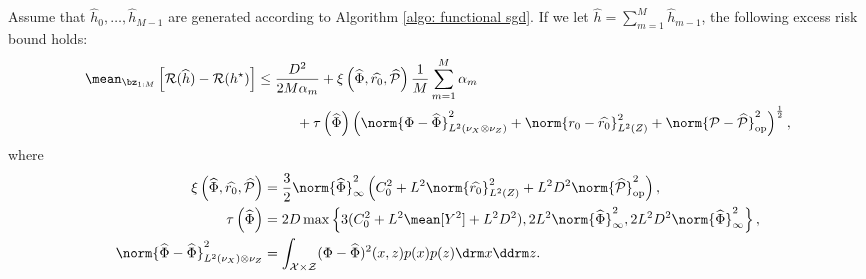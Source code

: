 \begin{theorem}
    Assume that $ \hat{ h }_{ 0 }, \dots, \hat{ h }_{ M-1 } $ are generated according to Algorithm \ref{algo: functional sgd}.
    If we let $ \hat{ h } = \sum_{ m=1 }^{ M } \hat{ h }_{ m-1 } $, the following excess risk bound holds:
    \begin{align*}
        \begin{split}
            \mean_{ \bz_{ 1:M } } \left[
                \risk ( \hat{ h } ) - \risk ( \hstar )
            \right]
            &\leq \frac{ D^2 }{ 2 M \alpha_{ m } }
            + \xi \left( \hat{ \Phi }, \hat{ r_{ 0 } }, \hat{ \meanop } \right) \frac{ 1 }{ M } \sum_{ m=1 }^{ M } \alpha_{ m } \\
            &\hspace{1cm}
            + \tau \left( \hat{ \Phi } \right) \left(
                \norm{ \Phi - \hat{ \Phi } }_{ L^{ 2 } ( \nu_{ X } \otimes \nu_{ Z } ) }^2 + \norm{ r_{ 0 } - \hat{ r_{ 0 } } }_{ L^2 ( Z ) }^2 + \norm{ \meanop - \hat{ \meanop } }_{ \op }^2
            \right)^{ \frac{ 1 }{ 2 } },
        \end{split}
    \end{align*}
    where
    \begin{align*}
        \xi \left( \hat{ \Phi }, \hat{ r_{ 0 } }, \hat{ \meanop } \right)
        &= \frac{ 3 }{ 2 } \norm{ \hat{ \Phi } }_{ \infty }^2 \left(
            C_{ 0 }^2 + L^2 \norm{ \hat{ r_{ 0 } } }_{ L^2 ( Z ) }^2 + L^2 D ^2 \norm{ \hat{ \meanop } }_{ \op }^2
        \right), \\
        \tau \left( \hat{ \Phi } \right)
        &= 2 D \max \left\{
            3 ( C_{ 0 }^2 + L^2 \mean [ Y^2 ] + L^2 D^2 ),
            2L^2 \norm{ \hat{ \Phi } }_{ \infty }^2,
            2L^2 D^2 \norm{ \hat{ \Phi } }_{ \infty }^2
        \right\}, \\
        \norm{ \hat{ \Phi } - \hat{ \Phi } }_{ L^2 ( \nu_{ X } ) \otimes \nu_{ Z } }^2
        &= \int_{ \mathcal{X} \times \mathcal{Z} } ( \Phi - \hat{ \Phi } )^2 ( x, z ) p ( x ) p ( z ) \drm x \ddrm z
    .\end{align*}
\end{theorem}

